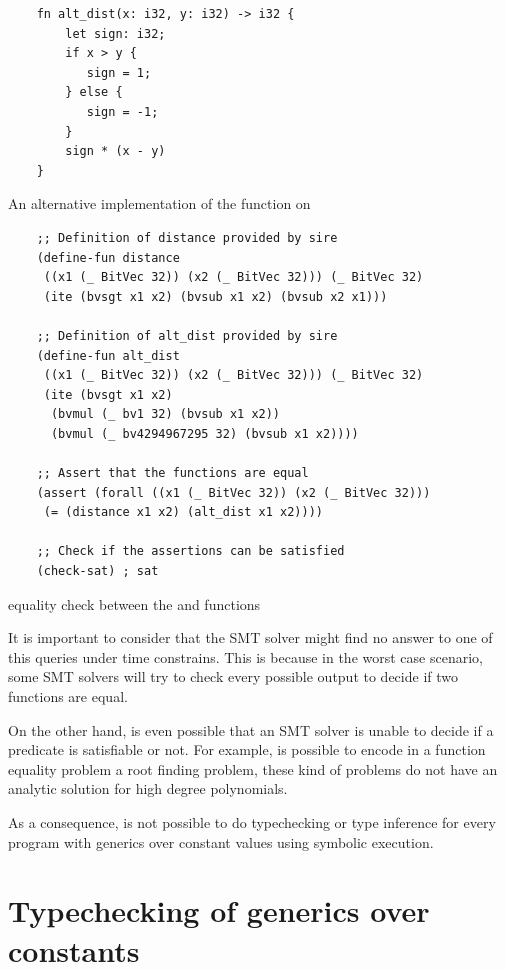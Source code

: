 \begin{listing}[h]
    \begin{verbatim}
    fn alt_dist(x: i32, y: i32) -> i32 {
        let sign: i32; 
        if x > y {
           sign = 1;
        } else {
           sign = -1;
        }
        sign * (x - y)
    }
    \end{verbatim}
    \caption{An alternative implementation of the  function on }
  \label{lst:alt_distance}
\end{listing}

\begin{listing}[h]
    \begin{verbatim}
    ;; Definition of distance provided by sire
    (define-fun distance 
     ((x1 (_ BitVec 32)) (x2 (_ BitVec 32))) (_ BitVec 32) 
     (ite (bvsgt x1 x2) (bvsub x1 x2) (bvsub x2 x1)))

    ;; Definition of alt_dist provided by sire
    (define-fun alt_dist 
     ((x1 (_ BitVec 32)) (x2 (_ BitVec 32))) (_ BitVec 32) 
     (ite (bvsgt x1 x2) 
      (bvmul (_ bv1 32) (bvsub x1 x2)) 
      (bvmul (_ bv4294967295 32) (bvsub x1 x2))))
    
    ;; Assert that the functions are equal
    (assert (forall ((x1 (_ BitVec 32)) (x2 (_ BitVec 32))) 
     (= (distance x1 x2) (alt_dist x1 x2)))) 

    ;; Check if the assertions can be satisfied
    (check-sat) ; sat
    \end{verbatim}
    \caption{equality check between the  and  functions}
  \label{lst:func_equality}
\end{listing}

It is important to consider that the SMT solver might find no answer to one of
this queries under time constrains. This is because in the worst case scenario,
some SMT solvers will try to check every possible output to decide if two
functions are equal. 

On the other hand, is even possible that an SMT solver is unable to decide if a
predicate is satisfiable or not. For example, is possible to encode in a
function equality problem  a root finding problem, these kind of problems do
not have an analytic solution for high degree polynomials.

As a consequence, is not possible to do typechecking or type inference for
every program with generics over constant values using symbolic execution.

\section{Typechecking of generics over constants}

